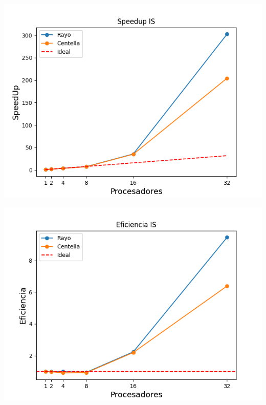 \begin{center}
 \centering
 \begin{minipage}[b]{.49\textwidth}
  \includegraphics[width=1\linewidth]{plots/speed-up-is.png}
  \label{is:speedup}
 \end{minipage}
 \begin{minipage}[b]{.49\textwidth}
  \includegraphics[width=1\linewidth]{plots/efficiency-is.png}
 \end{minipage}
\end{center}

